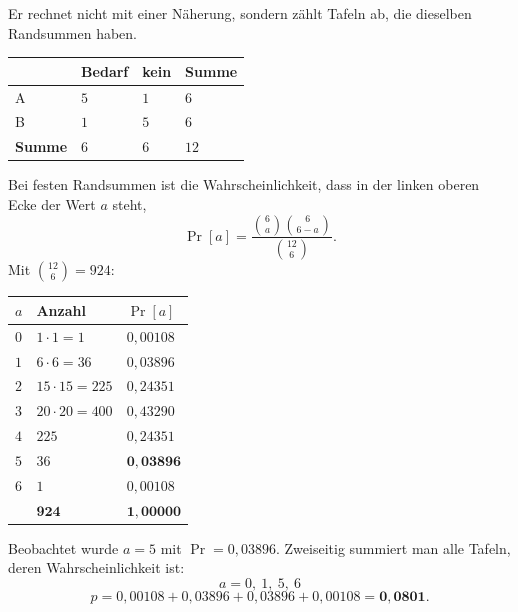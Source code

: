 \begin{merksatz}
Er rechnet nicht mit einer Näherung, sondern zählt  Tafeln ab, die dieselben Randsummen haben.

\begin{center}
\renewcommand{\arraystretch}{1.45}
\begin{tabular}{@{}P{2.0cm}P{1.6cm}P{1.6cm}P{1.6cm}@{}}
\toprule
& \textbf{Bedarf} & \textbf{kein} & \textbf{Summe}\\
\midrule
A & $5$ & $1$ & $6$\\
B & $1$ & $5$ & $6$\\
\midrule
\textbf{Summe} & $6$ & $6$ & $12$\\
\bottomrule
\end{tabular}
\end{center}

Bei festen Randsummen ist die Wahrscheinlichkeit, dass in der linken oberen Ecke der Wert $a$ steht,
\[ \Pr[a] = \frac{\binom{6}{a}\binom{6}{6-a}}{\binom{12}{6}} . \]
Mit $\binom{12}{6} = 924$:

\begin{center}
{\small
\renewcommand{\arraystretch}{1.35}
\begin{tabular}{@{}P{1.0cm}P{2.4cm}P{1.8cm}@{}}
\toprule
$a$ & \textbf{Anzahl} & $\Pr[a]$\\
\midrule
$0$ & $1 \cdot 1 = 1$ & $0{,}00108$\\
$1$ & $6 \cdot 6 = 36$ & $0{,}03896$\\
$2$ & $15 \cdot 15 = 225$ & $0{,}24351$\\
$3$ & $20 \cdot 20 = 400$ & $0{,}43290$\\
$4$ & $225$ & $0{,}24351$\\
$5$ & $36$ & $\mathbf{0{,}03896}$\\
$6$ & $1$ & $0{,}00108$\\
\midrule
& $\mathbf{924}$ & $\mathbf{1{,}00000}$\\
\bottomrule
\end{tabular}}
\end{center}

Beobachtet wurde $a = 5$ mit $\Pr = 0{,}03896$. Zweiseitig summiert man alle Tafeln, deren Wahrscheinlichkeit  ist:
\[ a = 0,\ 1,\ 5,\ 6 \]
\[ p = 0{,}00108 + 0{,}03896 + 0{,}03896 + 0{,}00108 = \mathbf{0{,}0801} . \]


\end{merksatz}
